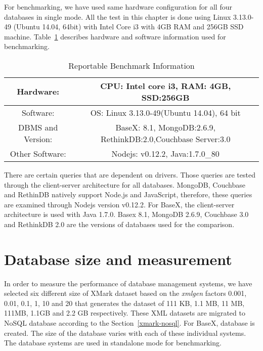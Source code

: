 For benchmarking, we have used same hardware configuration for all four databases in single mode. All the test in this chapter is done using  Linux 3.13.0-49 (Ubuntu 14.04, 64bit) with Intel Core i3 with 4GB RAM and 256GB SSD machine.
Table~\ref{benchmark-configuration-table} describes hardware and software information used for benchmarking. 
\begin{table}[h]	
	\centering
	\caption{Reportable Benchmark Information}
	\begin{tabular}{|c|c|c|c} 
		\hline
		Hardware: & \multicolumn{3}{|c|}{CPU: Intel core i3, RAM: 4GB, SSD:256GB  } \\
		\hline
		Software: & \multicolumn{3}{|c|}{OS: Linux 3.13.0-49(Ubuntu 14.04), 64 bit} \\
		\hline
		DBMS and Version: & \multicolumn{3}{|c|}{ BaseX: 8.1, MongoDB:2.6.9, RethinkDB:2.0,Couchbase Server:3.0 } \\
		\hline
		Other Software: & \multicolumn{3}{|c|}{Nodejs: v0.12.2, Java:1.7.0\_80 } \\
		\hline
	\end{tabular}	
	\label{benchmark-configuration-table}
\end{table}
There are certain queries that are dependent on drivers. Those queries are tested through the client-server architecture for all databases. MongoDB, Couchbase and RethinDB natively support Node.js and JavaScript, therefore, these queries are examined through Nodejs version  v0.12.2. For BaseX, the client-server architecture is used with Java 1.7.0. Basex 8.1, MongoDB 2.6.9, Couchbase 3.0 and RethinkDB 2.0 are the versions of databases used for the comparison. 
\par
\section{Database size and measurement}\label{benchmark-database-size}
In order to measure the performance of database management systems, we have selected six different size of XMark dataset based on the \textit{xmlgen} factors 0.001, 0.01, 0.1, 1, 10 and 20 that generates the dataset of 111 KB, 1.1 MB, 11 MB, 111MB, 1.1GB and 2.2 GB respectively. These XML datasets are migrated to NoSQL database according to the Section~\ref{xmark-nosql}. For BaseX, database is created. The size of the database varies with each of these individual systems. The database systems are used in standalone mode for benchmarking. 